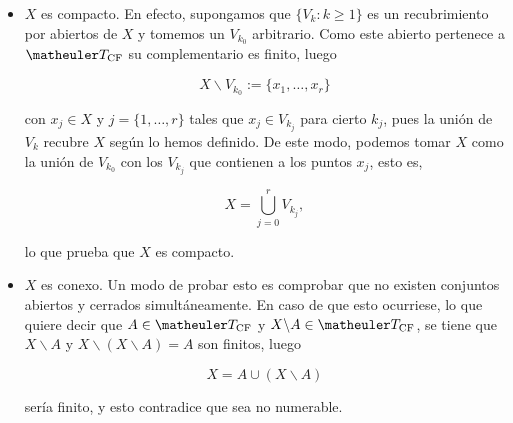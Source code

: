 \begin{itemize}
\item $X$ es compacto. En efecto, supongamos que $\{V_k : k \geq 1\}$ es un recubrimiento por abiertos de $X$ y tomemos un $V_{k_0}$ arbitrario. Como este abierto pertenece a $\T_{\text{CF}}$ su complementario es finito, luego 

\[X \backslash V_{k_0} := \{x_1, \ldots, x_r\}\]

con $x_j \in X$ y $j=\{1,\ldots, r\}$ tales que $x_j\in V_{k_j}$ para cierto $k_j$, pues la unión de $V_k$ recubre $X$ según lo hemos definido. De este modo, podemos tomar $X$ como la unión de $V_{k_0}$ con los $V_{k_j}$ que contienen a los puntos $x_j$, esto es,

\[X=\bigcup_{j=0}^r V_{k_j},\]

lo que prueba que $X$ es compacto. 

\item $X$ es conexo. Un modo de probar esto es comprobar que no existen conjuntos abiertos y cerrados simultáneamente. En caso de que esto ocurriese, lo que quiere decir que $A\in \T_{\text{CF}}$ y $X\backslash A \in \T_{\text{CF}}$, se tiene que $X \backslash A$ y $X\backslash (X\backslash A)=A$ son finitos, luego

\[X=A \cup (X\backslash A)\]

sería finito, y esto contradice que sea no numerable. 
\end{itemize}

